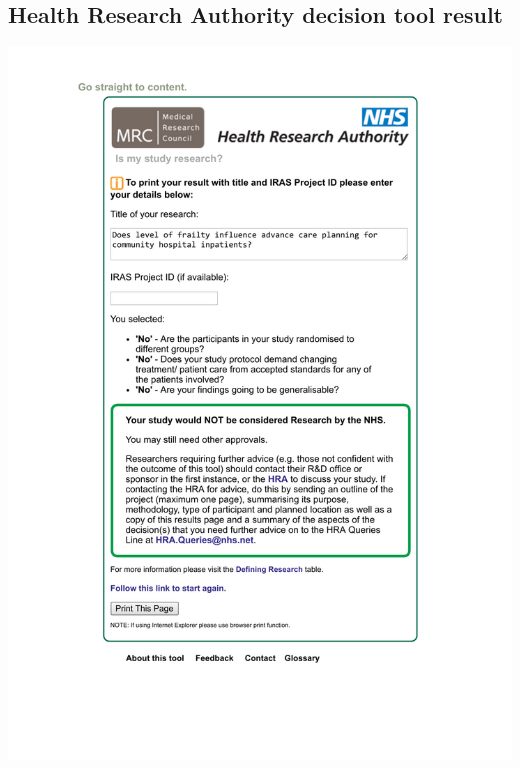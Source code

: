 \documentclass
[
	12pt,
	a4paper,
	oneside,
]{article}
\begin{document}
\begin{appendix}
\section{Health Research Authority decision tool result}
\label{appendix:hra}
\includegraphics[width=\textwidth]{hraresult.pdf}


\end{appendix}
\end{document}

